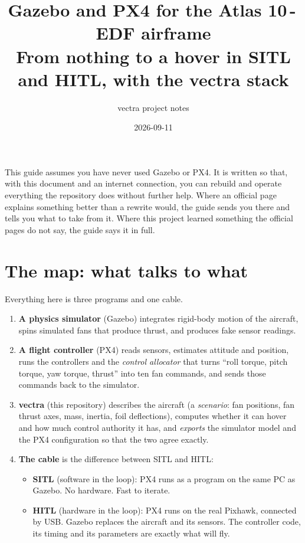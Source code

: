 \documentclass[11pt,a4paper]{article}
\title{Gazebo and PX4 for the Atlas 10\,-\,EDF airframe\\
\large From nothing to a hover in SITL and HITL, with the vectra stack}
\author{vectra project notes}
\date{2026-09-11}
\begin{document}
\maketitle

\noindent This guide assumes you have never used Gazebo or PX4. It is written so that, with this
document and an internet connection, you can rebuild and operate everything the repository does
without further help. Where an official page explains something better than a rewrite would, the
guide sends you there and tells you what to take from it. Where this project learned something the
official pages do not say, the guide says it in full.

\tableofcontents
\newpage

\section{The map: what talks to what}

Everything here is three programs and one cable.

\begin{enumerate}
  \item \textbf{A physics simulator} (Gazebo) integrates rigid-body motion of the aircraft, spins
        simulated fans that produce thrust, and produces fake sensor readings.
  \item \textbf{A flight controller} (PX4) reads sensors, estimates attitude and position, runs the
        controllers and the \emph{control allocator} that turns ``roll torque, pitch torque, yaw
        torque, thrust'' into ten fan commands, and sends those commands back to the simulator.
  \item \textbf{vectra} (this repository) describes the aircraft (a \emph{scenario}: fan positions,
        fan thrust axes, mass, inertia, foil deflections), computes whether it can hover and how
        much control authority it has, and \emph{exports} the simulator model and the PX4
        configuration so that the two agree exactly.
  \item \textbf{The cable} is the difference between SITL and HITL:
    \begin{itemize}
      \item \textbf{SITL} (software in the loop): PX4 runs as a program on the same PC as Gazebo.
            No hardware. Fast to iterate.
      \item \textbf{HITL} (hardware in the loop): PX4 runs on the real Pixhawk, connected by USB.
            Gazebo replaces the aircraft and its sensors. The controller code, its timing and its
            parameters are exactly what will fly.
    \end{itemize}
\end{enumerate}
\end{document}
